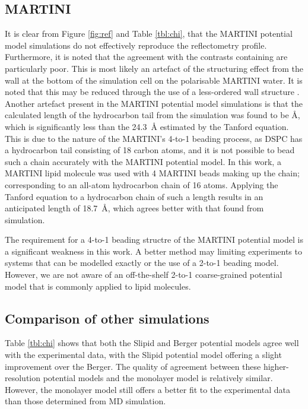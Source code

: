 \documentclass[amsmath,amssymb,twocolumn,superscriptaddress]{revtex4-1}
\begin{document}
\subsection{MARTINI}
It is clear from Figure \ref{fig:ref} and Table \ref{tbl:chi}, that the
MARTINI potential model simulations do not effectively reproduce the
reflectometry profile.
Furthermore, it is noted that the agreement with the contrasts containing
 are particularly poor.
This is most likely an artefact of the structuring effect from the wall at
the bottom of the simulation cell on the polarisable MARTINI water.
It is noted that this may be reduced through the use of a less-ordered wall
structure \cite{koutsioubas_combined_2016}.
Another artefact present in the MARTINI potential model
simulations is that the calculated length of the hydrocarbon tail from the
simulation was found to be
\si{\angstrom}, which is
significantly less than the \SI{24.3}{\angstrom} estimated by the Tanford
equation.
This is due to the nature of the MARTINI's 4-to-1 beading process, as DSPC
has a hydrocarbon tail consisting of 18 carbon atoms, and it is not possible
to bead such a chain accurately with the MARTINI potential model.
In this work, a MARTINI lipid molecule was used with 4 MARTINI beads making
up the chain; corresponding to an all-atom hydrocarbon chain of 16 atoms.
Applying the Tanford equation to a hydrocarbon chain of such a length
results in an anticipated length of \SI{18.7}{\angstrom}, which agrees
better with that found from simulation.

The requirement for a 4-to-1 beading structre of the MARTINI potential model
is a significant weakness in this work.
A better method may limiting experiments to systems that can be modelled
exactly or the use of a 2-to-1 beading model.
However, we are not aware of an off-the-shelf 2-to-1 coarse-grained
potential model that is commonly applied to lipid molecules.

\subsection{Comparison of other simulations}
Table \ref{tbl:chi} shows that both the Slipid and Berger potential models
agree well with the experimental data, with the Slipid potential model
offering a slight improvement over the Berger.
The quality of agreement between these higher-resolution potential models
and the monolayer model is relatively similar.
However, the monolayer model still offers a better fit to the experimental
data than those determined from MD simulation.
\end{document}
